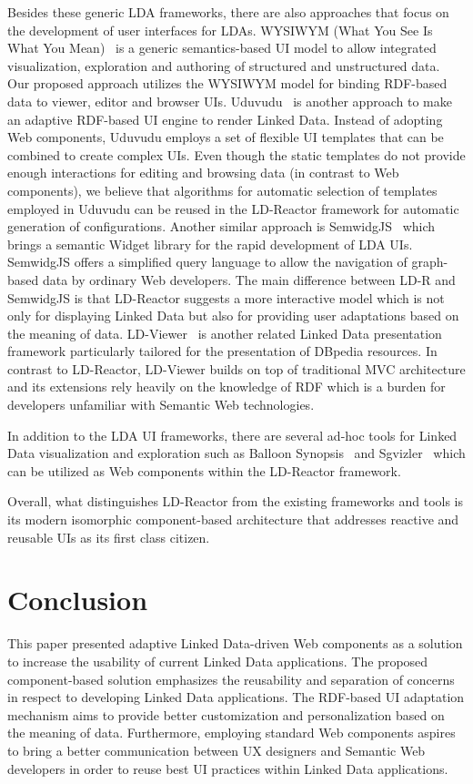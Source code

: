 \documentclass{acm_proc_article-sp}
\begin{document}
Besides these generic LDA frameworks, there are also approaches that focus on the development of user interfaces for LDAs.
WYSIWYM (What You See Is What You Mean)~\cite{WYSIWYM2014} is a generic semantics-based UI model to allow integrated visualization, exploration and authoring of structured and unstructured data.
Our proposed approach utilizes the WYSIWYM model for binding RDF-based data to viewer, editor and browser UIs.
Uduvudu~\cite{Uduvudu2015} is another approach to make an adaptive RDF-based UI engine to render Linked Data.
Instead of adopting Web components, Uduvudu employs a set of flexible UI templates that can be combined to create complex UIs. 
Even though the static templates do not provide enough interactions for editing and browsing data (in contrast to Web components), we believe that algorithms for automatic selection of templates employed in Uduvudu can be reused in the LD-Reactor framework for automatic generation of configurations.
Another similar approach is SemwidgJS~\cite{StegemannZ14} which brings a semantic Widget library for the rapid development of LDA UIs.
SemwidgJS offers a simplified query language to allow the navigation of graph-based data by ordinary Web developers.
The main difference between LD-R and SemwidgJS is that LD-Reactor suggests a more interactive model which is not only for displaying Linked Data but also for providing user adaptations based on the meaning of data.
LD-Viewer~\cite{Lukovnikov2014} is another related Linked Data presentation framework particularly tailored for the presentation of DBpedia resources.
In contrast to LD-Reactor, LD-Viewer  builds on top of traditional MVC architecture and its extensions rely heavily on the knowledge of RDF which is a burden for developers unfamiliar with Semantic Web technologies.

In addition to the LDA UI frameworks, there are several ad-hoc tools for Linked Data visualization and exploration such as Balloon Synopsis~\cite{BalloonSchlegelWSGK14} and Sgvizler~\cite{Sgvizler} which can  be utilized as Web components within the LD-Reactor framework. 

Overall, what distinguishes LD-Reactor from the existing frameworks and tools is its modern isomorphic component-based architecture that addresses reactive and reusable UIs as its first class citizen.

\section{Conclusion}
This paper presented adaptive Linked Data-driven Web components as a solution to increase the usability of current Linked Data applications.
The proposed component-based solution emphasizes the reusability and separation of concerns in respect to developing Linked Data applications.
The RDF-based UI adaptation mechanism aims to provide better customization and personalization based on the meaning of data.
Furthermore, employing standard Web components aspires to bring a better communication between UX designers and Semantic Web developers in order to reuse best UI practices within Linked Data applications.
\end{document}

